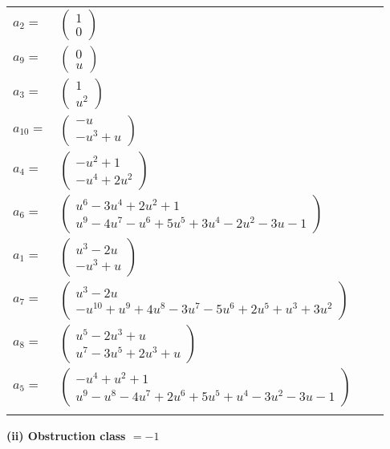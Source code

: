\documentclass[1p]{elsarticle_modified}
\theoremstyle{definition}
\begin{document}
\begin{tabular}{m{7pt} m{180pt} m{7pt} m{180pt} }
\flushright $a_{2}=$&$\begin{pmatrix}1\\0\end{pmatrix}$ \\
\flushright $a_{9}=$&$\begin{pmatrix}0\\u\end{pmatrix}$ \\
\flushright $a_{3}=$&$\begin{pmatrix}1\\u^2\end{pmatrix}$ \\
\flushright $a_{10}=$&$\begin{pmatrix}- u\\- u^3+u\end{pmatrix}$ \\
\flushright $a_{4}=$&$\begin{pmatrix}- u^2+1\\- u^4+2 u^2\end{pmatrix}$ \\
\flushright $a_{6}=$&$\begin{pmatrix}u^6-3 u^4+2 u^2+1\\u^9-4 u^7- u^6+5 u^5+3 u^4-2 u^2-3 u-1\end{pmatrix}$ \\
\flushright $a_{1}=$&$\begin{pmatrix}u^3-2 u\\- u^3+u\end{pmatrix}$ \\
\flushright $a_{7}=$&$\begin{pmatrix}u^3-2 u\\- u^{10}+u^9+4 u^8-3 u^7-5 u^6+2 u^5+u^3+3 u^2\end{pmatrix}$ \\
\flushright $a_{8}=$&$\begin{pmatrix}u^5-2 u^3+u\\u^7-3 u^5+2 u^3+u\end{pmatrix}$ \\
\flushright $a_{5}=$&$\begin{pmatrix}- u^4+u^2+1\\u^9- u^8-4 u^7+2 u^6+5 u^5+u^4-3 u^2-3 u-1\end{pmatrix}$\\&\end{tabular}
\flushleft \textbf{(ii) Obstruction class $= -1$}\\~\\
\end{document}
